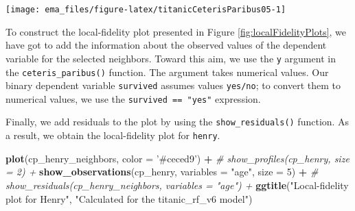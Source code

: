 \documentclass[12pt,]{krantz}
\newenvironment{Shaded}{\begin{snugshade}}{\end{snugshade}}
\newcommand{\CommentTok}[1]{\textcolor[rgb]{0.56,0.35,0.01}{\textit{#1}}}
\newcommand{\DataTypeTok}[1]{\textcolor[rgb]{0.13,0.29,0.53}{#1}}
\newcommand{\DecValTok}[1]{\textcolor[rgb]{0.00,0.00,0.81}{#1}}
\newcommand{\FloatTok}[1]{\textcolor[rgb]{0.00,0.00,0.81}{#1}}
\newcommand{\KeywordTok}[1]{\textcolor[rgb]{0.13,0.29,0.53}{\textbf{#1}}}
\newcommand{\NormalTok}[1]{#1}
\newcommand{\OperatorTok}[1]{\textcolor[rgb]{0.81,0.36,0.00}{\textbf{#1}}}
\newcommand{\StringTok}[1]{\textcolor[rgb]{0.31,0.60,0.02}{#1}}
\begin{document}
\begin{center}\texttt{[image: ema\_files/figure-latex/titanicCeterisParibus05-1]} \end{center}

To construct the local-fidelity plot presented in Figure \ref{fig:localFidelityPlots}, we have got to add the information about the observed values of the dependent variable for the selected neighbors. Toward this aim, we use the \texttt{y} argument in the \texttt{ceteris\_paribus()} function. The argument takes numerical values. Our binary dependent variable \texttt{survived} assumes values \texttt{yes/no}; to convert them to numerical values, we use the \texttt{survived\ ==\ "yes"} expression.

\begin{Shaded}
\end{Shaded}

Finally, we add residuals to the plot by using the \texttt{show\_residuals()} function. As a result, we obtain the local-fidelity plot for \texttt{henry}.

\begin{Shaded}
\begin{Highlighting}[]
\KeywordTok{plot}\NormalTok{(cp_henry_neighbors, }\DataTypeTok{color =} \StringTok{'#ceced9'}\NormalTok{) }\OperatorTok{+}
\CommentTok{#  show_profiles(cp_henry, size = 2) + }
\StringTok{  }\KeywordTok{show_observations}\NormalTok{(cp_henry, }\DataTypeTok{variables =} \StringTok{"age"}\NormalTok{, }\DataTypeTok{size =} \DecValTok{5}\NormalTok{) }\OperatorTok{+}
\CommentTok{#  show_residuals(cp_henry_neighbors, variables = "age") +}
\StringTok{  }\KeywordTok{ggtitle}\NormalTok{(}\StringTok{"Local-fidelity plot for Henry"}\NormalTok{, }\StringTok{"Calculated for the titanic_rf_v6 model"}\NormalTok{)}
\end{Highlighting}
\end{Shaded}
\end{document}
